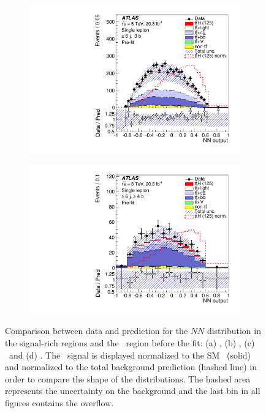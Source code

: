 \begin{figure}[tpb!]
\begin{subfigure}{0.49\textwidth}
  \caption{}\end{subfigure}
  \begin{subfigure}{0.49\textwidth}
  \includegraphics[width=\textwidth]{Analysis/Figures_ttH/NN_6jetin3btagex8TeV_before.pdf}
  \caption{}\end{subfigure}
  \begin{subfigure}{0.49\textwidth}
  \includegraphics[width=\textwidth]{Analysis/Figures_ttH/NN_6jetin4btagin8TeV_before.pdf}
  \caption{}\end{subfigure}
  \caption{Comparison between data and prediction for the $NN$ distribution in the signal-rich regions and the \fivethree\ region before the fit:
  (a) \fivethree, (b) \fivefour, (c) \sixthree\ and (d) \sixfour.
  The \tth\ signal is displayed normalized to the SM \xsec\ (solid) and normalized to the total background prediction (hashed line) in order to compare the shape of the distributions.
The hashed area represents the uncertainty on the background and the last bin in all figures contains the overflow. 
}
  \label{fig:prefit_ttH_2}
\end{figure}

